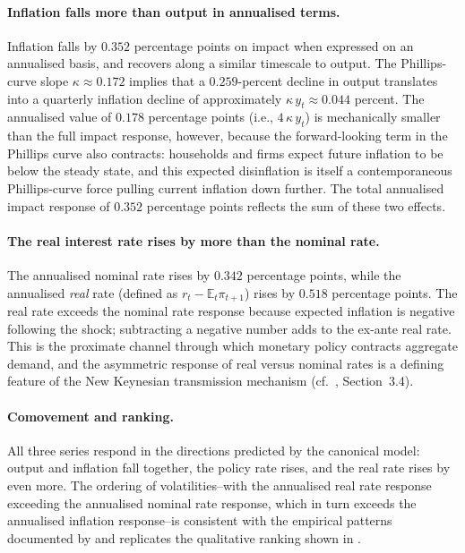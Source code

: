 \paragraph{Inflation falls more than output in annualised terms.}
Inflation falls by $0.352$ percentage points on impact when expressed
on an annualised basis, and recovers along a similar timescale to
output. The Phillips-curve slope $\kappa\approx 0.172$ implies that a
$0.259$-percent decline in output translates into a quarterly inflation
decline of approximately $\kappa\,y_{t}\approx 0.044$ percent. The
annualised value of $0.178$ percentage points (i.e., $4\,\kappa\,y_{t}$)
is mechanically smaller than the full impact response, however, because
the forward-looking term in the Phillips curve also contracts:
households and firms expect future inflation to be below the steady
state, and this expected disinflation is itself a contemporaneous
Phillips-curve force pulling current inflation down further. The total annualised impact response
of $0.352$ percentage points reflects the sum of these two effects.

\paragraph{The real interest rate rises by more than the nominal rate.}
The annualised nominal rate rises by $0.342$ percentage points, while
the annualised \textit{real} rate (defined as $r_{t}-\mathbb{E}_{t}
\pi_{t+1}$) rises by $0.518$ percentage points. The real rate exceeds
the nominal rate response because expected inflation is negative
following the shock; subtracting a negative number adds to the
ex-ante real rate. This is the proximate channel through which monetary
policy contracts aggregate demand, and the asymmetric response of
real versus nominal rates is a defining feature of the New Keynesian
transmission mechanism (cf.\ \citealp{Gali2008}, Section~3.4).

\paragraph{Comovement and ranking.}
All three series respond in the directions predicted by the canonical
model: output and inflation fall together, the policy rate rises, and
the real rate rises by even more. The ordering of volatilities--with
the annualised real rate response exceeding the annualised nominal
rate response, which in turn exceeds the annualised inflation
response--is consistent with the empirical patterns documented by
\citet{ChristianoEichenbaumEvans2005} and replicates the qualitative
ranking shown in \citet[][Figure~3.1]{Gali2008}.
